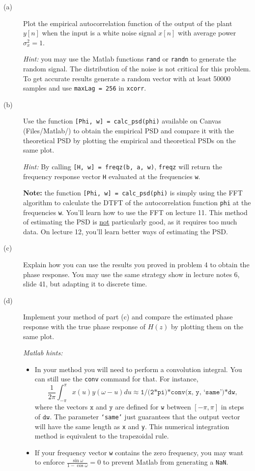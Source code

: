 \documentclass[12pt]{report}
\begin{document}
\begin{description}
	\item[(a)] Plot the empirical autocorrelation function of the output of the plant $y[n]$ when the input is a white noise signal $x[n]$ with average power $\sigma_x^2 = 1$. 
	
	\textit{Hint:} you may use the Matlab functions \texttt{rand} or \texttt{randn} to generate the random signal. The distribution of the noise is not critical for this problem. To get accurate results generate a random vector with at least 50000 samples and use \texttt{maxLag = 256} in \texttt{xcorr}.
	
	\item[(b)] Use the function \texttt{[Phi, w] = calc\_psd(phi)} available on Canvas (Files/Matlab/) to obtain the empirical PSD and compare it with the theoretical PSD by plotting the empirical and theoretical PSDs on the same plot.
	
	\textit{Hint:} By calling \texttt{[H, w] = freqz(b, a, w)}, \texttt{freqz} will return the frequency response vector \texttt{H} evaluated at the frequencies \texttt{w}.
	
	\textbf{Note:} the function \texttt{[Phi, w] = calc\_psd(phi)} is simply using the FFT algorithm to calculate the DTFT of the autocorrelation function \texttt{phi} at the frequencies \texttt{w}. You'll learn how to use the FFT on lecture 11. This method of estimating the PSD is \underline{not} particularly good, as it requires too much data. On lecture 12, you'll  learn better ways of estimating the PSD.
		
	\item[(c)] Explain how you can use the results you proved in problem 4 to obtain the phase response. You may use the same strategy show in lecture notes 6, slide 41, but adapting it to discrete time.
	
	\item[(d)] Implement your method of part (c) and compare the estimated phase response with the true phase response of $H(z)$ by plotting them on the same plot. 
		
	\textit{Matlab hints:}
	\begin{itemize}
		\item In your method you will need to perform a convolution integral. You can still use the \texttt{conv} command for that. For instance,
		\begin{equation}
		\frac{1}{2\pi}\int_{-\pi}^{\pi}x(u)y(\omega-u)du \approx \texttt{1/(2*pi)*conv(x, y, `same')*dw},
		\end{equation}
		where the vectors $\texttt{x}$ and  $\texttt{y}$ are defined for $\texttt{w}$ between $[-\pi, \pi]$ in steps of $\texttt{dw}$. The parameter \texttt{`same'} just guarantees that the output vector will have the same length as \texttt{x} and \texttt{y}. This numerical integration method is equivalent to the trapezoidal rule.
		\item If your frequency vector \texttt{w} contains the zero frequency, you may want to enforce $\frac{\sin\omega}{1-\cos\omega}  = 0$ to prevent Matlab from generating a \texttt{NaN}.
	\end{itemize}
		

\end{description}
\end{document}
